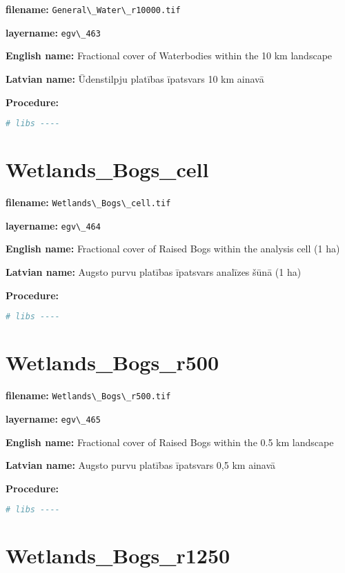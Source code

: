\documentclass[
]{book}
\newcommand{\passthrough}[1]{#1}
\begin{document}
\textbf{filename:} \passthrough{\lstinline!General\_Water\_r10000.tif!}

\textbf{layername:} \passthrough{\lstinline!egv\_463!}

\textbf{English name:} Fractional cover of Waterbodies within the 10 km landscape

\textbf{Latvian name:} Ūdenstilpju platības īpatsvars 10 km ainavā

\textbf{Procedure:}

\begin{lstlisting}[language=R]
# libs ----
\end{lstlisting}

\section{Wetlands\_Bogs\_cell}\label{ch06.464}

\textbf{filename:} \passthrough{\lstinline!Wetlands\_Bogs\_cell.tif!}

\textbf{layername:} \passthrough{\lstinline!egv\_464!}

\textbf{English name:} Fractional cover of Raised Bogs within the analysis cell (1 ha)

\textbf{Latvian name:} Augsto purvu platības īpatsvars analīzes šūnā (1 ha)

\textbf{Procedure:}

\begin{lstlisting}[language=R]
# libs ----
\end{lstlisting}

\section{Wetlands\_Bogs\_r500}\label{ch06.465}

\textbf{filename:} \passthrough{\lstinline!Wetlands\_Bogs\_r500.tif!}

\textbf{layername:} \passthrough{\lstinline!egv\_465!}

\textbf{English name:} Fractional cover of Raised Bogs within the 0.5 km landscape

\textbf{Latvian name:} Augsto purvu platības īpatsvars 0,5 km ainavā

\textbf{Procedure:}

\begin{lstlisting}[language=R]
# libs ----
\end{lstlisting}

\section{Wetlands\_Bogs\_r1250}\label{ch06.466}
\end{document}
